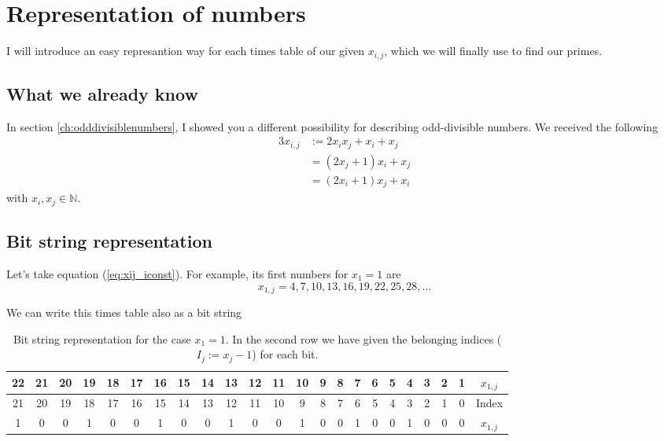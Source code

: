 \chapter{Representation of numbers}
\label{ch:representationofnumbers}
\minitoc
I will introduce an easy represantion way for each times table of our given $x_{i,j}$, which we will finally use to find our primes.
\section{What we already know}
\label{s:whatwealreadyknow}
In section \ref{ch:odddivisiblenumbers}, I showed you a different possibility for describing odd-divisible numbers. We received the following
\begin{alignat}{3}
	x_{i,j} &:= 2x_{i}x_{j} + x_{i} + x_{j} \label{eq:xij_gen} \\
	&= \left(2x_{j} + 1\right)x_{i} + x_{j} \label{eq:xij_jconst} \\
	&= \left(2x_{i} + 1\right)x_{j} + x_{i} \label{eq:xij_iconst}	
\end{alignat}
with $x_{i}, x_{j} \in \mathbb{N}$.
\section{Bit string representation}
\label{s:bitstringrepresantion}
Let's take equation (\ref{eq:xij_iconst}). For example, its first numbers for $x_{1} = 1$ are
\begin{equation}
	x_{1,j} = 4, 7, 10, 13, 16, 19, 22, 25, 28, \dots
\label{eq:xi1_firstnumbers}\end{equation}

We can write this times table also as a bit string

\begin{table}[H]
\centering
\caption{Bit string representation for the case $x_{1} = 1$. In the second row we have given the belonging indices ($I_{j} := x_{j} - 1$) for each bit.}
\tiny
\begin{tabular}{cccccccccccccccccccccc||c}
				\cellcolor{yellow} 22 & 21 & 20 & \cellcolor{yellow} 19 & 18 & 17 & \cellcolor{yellow} 16 & 15 & 14 & \cellcolor{yellow} 13 & 12 & 11 & \cellcolor{yellow} 10 & 9 & 8 & \cellcolor{yellow} 7 & 6 & 5 & \cellcolor{yellow} 4 & 3 & 2 & 1 & $x_{1,j}$ \\
\hline				21 & 20 & 19 & 18 & 17 & 16 & 15 & 14 & 13 & 12 & 11 & 10 & 9  & 8 & 7 & 6 & 5 & 4 & 3 & 2 & 1 & 0 & Index \\
\hline\hline \rowcolor{green}	\cellcolor{red} 1 &  0 &  0 &  \cellcolor{red} 1 &  0 &  0 & \cellcolor{red} 1 &  0 &  0 & \cellcolor{red} 1 &  0 &  0 & \cellcolor{red} 1 & 0 & 0 & \cellcolor{red} 1 & 0 & 0 & \cellcolor{red} 1 & 0 & 0 & 0 & $x_{1,j}$
\end{tabular}
\label{tab:stepn0_1_valuesfordiv3}
\end{table}

